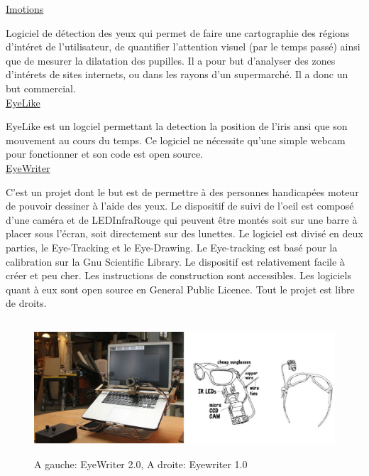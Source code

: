 \documentclass[a4paper, 12pt]{report}
\begin{document}
\underline{Imotions\cite{c3}}\\
\par Logiciel de détection des yeux qui permet de faire une cartographie des régions d'intéret de l'utilisateur, de quantifier l'attention visuel (par le temps passé) ainsi que de mesurer la dilatation des pupilles. Il a pour but d'analyser des zones d'intérets de sites internets, ou dans les rayons d'un supermarché. Il a donc un but commercial.\\

\underline{EyeLike\cite{c17}}\\
\par EyeLike est un logciel permettant la detection la position de l'iris ansi que son mouvement au cours du temps. Ce logiciel ne nécessite qu'une simple webcam pour fonctionner et son code est open source.\\

\underline{EyeWriter\cite{c4}}\\
\par C'est un projet dont le but est de permettre à des personnes handicapées moteur de pouvoir dessiner à l'aide des yeux. Le dispositif de suivi de l'oeil est composé d'une caméra et de LEDInfraRouge qui peuvent être montés soit sur une barre à placer sous l'écran, soit directement sur des lunettes. Le logiciel est divisé en deux parties, le Eye-Tracking et le Eye-Drawing. Le Eye-tracking est basé pour la calibration sur la Gnu Scientific Library\cite{c6}. Le dispositif est relativement facile à créer et peu cher. Les instructions de construction sont accessibles.  Les logiciels quant à eux sont open source en General Public Licence. Tout le projet est libre de droits.
\begin{figure}[!ht]
\centering
\includegraphics[height=5cm]{camw.jpg}
\caption{A gauche: EyeWriter 2.0, A droite: Eyewriter 1.0}
\end{figure}
\end{document}
